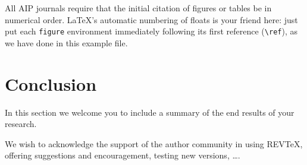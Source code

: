 \documentclass[aip,cp,amsmath,amssymb,reprint]{revtex4-2}
\begin{document}
All AIP journals require that the initial citation of
figures or tables be in numerical order.
\LaTeX's automatic numbering of floats is your friend here:
just put each \texttt{figure} environment immediately following
its first reference (\verb+\ref+), as we have done in this example file.

\section{Conclusion}

In this section we welcome you to include a summary of the end results of your research.

\begin{acknowledgments}
We wish to acknowledge the support of the author community in using
REV\TeX{}, offering suggestions and encouragement, testing new versions,
\dots.
\end{acknowledgments}

\nocite{*}
\end{document}
